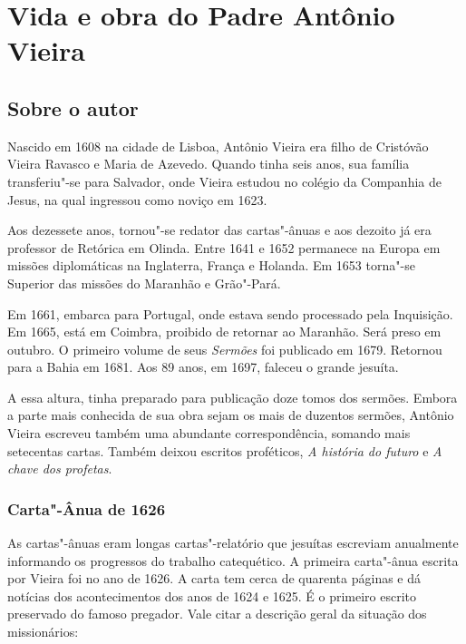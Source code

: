 \chapter{Vida e obra do Padre Antônio Vieira}

\section{Sobre o autor}

Nascido em 1608 na cidade de Lisboa, Antônio Vieira era filho de
Cristóvão Vieira Ravasco e Maria de Azevedo. Quando tinha seis anos, sua
família transferiu"-se para Salvador, onde Vieira estudou no colégio da
Companhia de Jesus, na qual ingressou como noviço em 1623.

Aos dezessete anos, tornou"-se redator das cartas"-ânuas e aos dezoito já
era professor de Retórica em Olinda. Entre 1641 e 1652 permanece na
Europa em missões diplomáticas na Inglaterra, França e Holanda. Em 1653
torna"-se Superior das missões do Maranhão e Grão"-Pará.

Em 1661, embarca para Portugal, onde estava sendo processado pela
Inquisição. Em 1665, está em Coimbra, proibido de retornar ao Maranhão.
Será preso em outubro. O primeiro volume de seus \emph{Sermões} foi
publicado em 1679. Retornou para a Bahia em 1681. Aos 89 anos, em 1697,
faleceu o grande jesuíta.

A essa altura, tinha preparado para publicação doze tomos dos sermões.
Embora a parte mais conhecida de sua obra sejam os mais de duzentos
sermões, Antônio Vieira escreveu também uma abundante correspondência,
somando mais setecentas cartas. Também deixou escritos proféticos,
\emph{A história do futuro} e \emph{A chave dos profetas}.

\subsection{Carta"-Ânua de 1626}

As cartas"-ânuas eram longas cartas"-relatório que jesuítas escreviam
anualmente informando os progressos do trabalho catequético. A primeira
carta"-ânua escrita por Vieira foi no ano de 1626. A carta tem cerca de
quarenta páginas e dá notícias dos acontecimentos dos anos de 1624 e
1625. É o primeiro escrito preservado do famoso pregador. Vale citar a
descrição geral da situação dos missionários:

